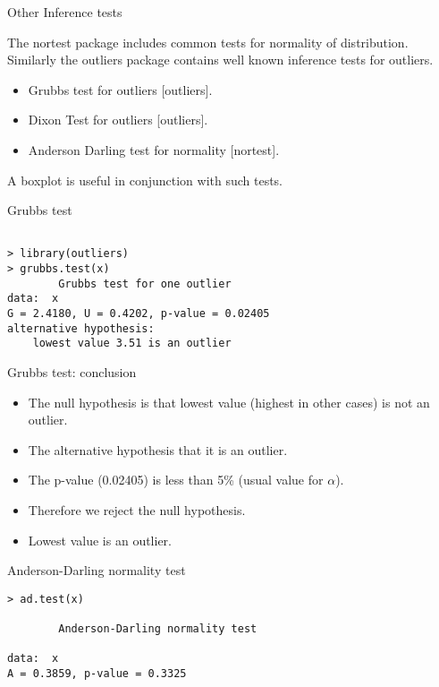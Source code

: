 \documentclass[pdf,default,slideColor,colorBG]{prosper}
\begin{document}

\begin{slide}{Other Inference tests}

The nortest package includes common tests for normality of distribution. Similarly the outliers package contains well known inference tests for outliers.

\begin{itemize}
\item Grubbs test for outliers [outliers].
\item Dixon Test for outliers [outliers].
\item Anderson Darling test for normality [nortest].
\end{itemize}
 A boxplot is useful in conjunction with such tests.
\end{slide}



\begin{slide}{Grubbs test}
\begin{verbatim}

> library(outliers)
> grubbs.test(x)
        Grubbs test for one outlier
data:  x
G = 2.4180, U = 0.4202, p-value = 0.02405
alternative hypothesis:
    lowest value 3.51 is an outlier
\end{verbatim}
\end{slide}

\begin{slide}{Grubbs test: conclusion}
\begin{itemize}
\item The null hypothesis is that lowest value (highest in other cases) is not an outlier.
\item The alternative hypothesis that it is an outlier.
\item The p-value (0.02405) is less than 5\% (usual value for $\alpha$).
\item Therefore we reject the null hypothesis.
\item Lowest value is an outlier.
\end{itemize}
\end{slide}
\begin{slide}{Anderson-Darling normality test}
\begin{verbatim}
> ad.test(x)

        Anderson-Darling normality test

data:  x
A = 0.3859, p-value = 0.3325
\end{verbatim}
\end{slide}
\end{document}

